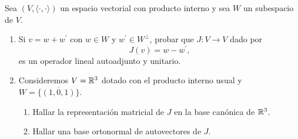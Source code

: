 \item Sea $(V,\langle\cdot,\cdot\rangle)$ un espacio vectorial con producto interno y sea $W$ un subespacio de $V$.
    \begin{enumerate}
        \item Si $v=w+w^\prime$ con $w\in W$ y $w^\prime\in W^\perp$, probar que $J:V\to V$ dado por \[J(v)=w-w^\prime,\]
            es un operador lineal autoadjunto y unitario.
            \begin{mdframed}[style=s]
                
            \end{mdframed}
        \item Consideremos $V=\mathbb{R}^3$ dotado con el producto interno usual y $W=\overline{\{(1,0,1)\}}$.
            \begin{enumerate}
                \item Hallar la representación matricial de $J$ en la base canónica de $\mathbb{R}^3$.
                    \begin{mdframed}[style=s]
                        
                    \end{mdframed}
                \item Hallar una base ortonormal de autovectores de $J$.
                    \begin{mdframed}[style=s]
                        
                    \end{mdframed}
            \end{enumerate}
    \end{enumerate}